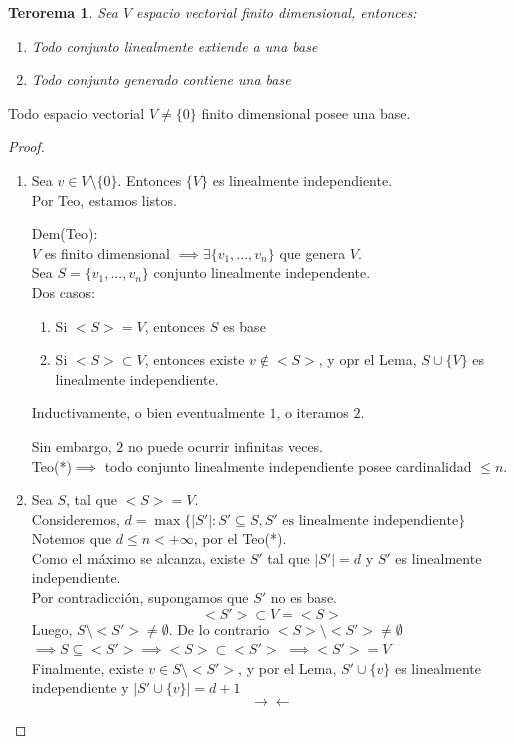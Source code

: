 \documentclass[11pt]{book}
\newtheorem{thm}{Terorema}[section]
\theoremstyle{definition}
\begin{document}
\begin{thm}
Sea $V$ espacio vectorial finito dimensional, entonces:
\begin{enumerate}
	\item Todo conjunto linealmente extiende a una base
	
	\item Todo conjunto generado contiene una base
\end{enumerate}

\end{thm}
Todo espacio vectorial $V\neq\{0\}$ finito dimensional posee una base.\\
\begin{proof}
\begin{enumerate}[label=\alph*)]
	\item Sea $v\in V\setminus\{0\}$. Entonces $\{V\}$ es linealmente independiente.\\
	Por Teo, estamos listos.
	
	Dem(Teo):\\
	$V$ es finito dimensional $\implies\exists\{v_1,...,v_n\}$ que genera $V$.\\
	Sea $S=\{v_1,...,v_n\}$ conjunto linealmente independente.\\
	Dos casos:
	\begin{enumerate}
		\item Si $<S>=V$, entonces $S$ es base
		
		\item Si $<S>\subset V$, entonces existe $v\notin<S>$, y opr el Lema, $S\cup\{V\}$ es linealmente independiente.
	\end{enumerate}
	Inductivamente, o bien eventualmente $1$, o iteramos $2$.
	
	Sin embargo, $2$ no puede ocurrir infinitas veces.\\
	Teo(*)$\implies$ todo conjunto linealmente independiente posee cardinalidad $\leq n$.
	
	\item Sea $S$, tal que $<S>=V$.\\
	Consideremos, $d=\max\{|S'|:S'\subseteq S, S'\textrm{ es linealmente independiente}\}$\\
	Notemos que $d\leq n<+\infty$, por el Teo(*).\\
	Como el máximo se alcanza, existe $S'$ tal que $|S'|=d$ y $S'$ es linealmente independiente.\\
	Por contradicción, supongamos que $S'$ no es base.
	\[
	<S'>\subset V=<S>
	\]
	Luego, $S\setminus<S'>\neq\emptyset$. De lo contrario $<S>\setminus<S'>\neq\emptyset$\\
	$\implies S\subseteq <S'>\implies <S>\subset<S'>$
	$\implies <S'>=V$\\
	Finalmente, existe $v\in S\setminus<S'>$, y por el Lema, $S'\cup\{v\}$ es linealmente independiente y $|S'\cup\{v\}|=d+1$
	\[
	\rightarrow\leftarrow
	\]
\end{enumerate}
\end{proof}
\end{document}
